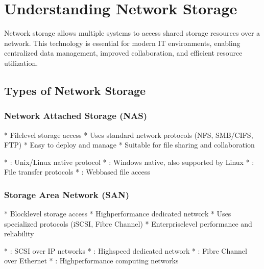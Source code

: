 \documentclass[letterpaper,10pt,english]{sphinxmanual}
\begin{document}
\section{Understanding Network Storage}
\label{\detokenize{network-storage:understanding-network-storage}}
\sphinxAtStartPar
Network storage allows multiple systems to access shared storage resources over a network. This technology is essential for modern IT environments, enabling centralized data management, improved collaboration, and efficient resource utilization.


\subsection{Types of Network Storage}
\label{\detokenize{network-storage:types-of-network-storage}}

\subsubsection{Network Attached Storage (NAS)}
\label{\detokenize{network-storage:network-attached-storage-nas}}
\sphinxAtStartPar
{}
* File\sphinxhyphen{}level storage access
* Uses standard network protocols (NFS, SMB/CIFS, FTP)
* Easy to deploy and manage
* Suitable for file sharing and collaboration

\sphinxAtStartPar
{}
* : Unix/Linux native protocol
* : Windows native, also supported by Linux
* : File transfer protocols
* : Web\sphinxhyphen{}based file access


\subsubsection{Storage Area Network (SAN)}
\label{\detokenize{network-storage:storage-area-network-san}}
\sphinxAtStartPar
{}
* Block\sphinxhyphen{}level storage access
* High\sphinxhyphen{}performance dedicated network
* Uses specialized protocols (iSCSI, Fibre Channel)
* Enterprise\sphinxhyphen{}level performance and reliability

\sphinxAtStartPar
{}
* : SCSI over IP networks
* : High\sphinxhyphen{}speed dedicated network
* : Fibre Channel over Ethernet
* : High\sphinxhyphen{}performance computing networks
\end{document}
